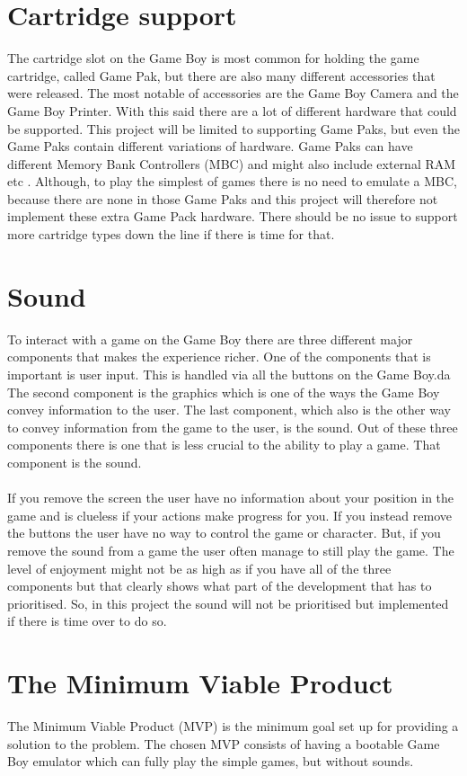\section{Cartridge support}
The cartridge slot on the Game Boy is most common for holding the game cartridge, called Game Pak, but there are also many different accessories that were released.
The most notable of accessories are the Game Boy Camera and the Game Boy Printer.
With this said there are a lot of different hardware that could be supported.
This project will be limited to supporting Game Paks, but even the Game Paks contain different variations of hardware.
Game Paks can have different Memory Bank Controllers (MBC) and might also include external RAM etc \cite{cartridgeType}.
Although, to play the simplest of games there is no need to emulate a MBC, because there are none in those Game Paks and this project will therefore not implement these extra Game Pack hardware.
There should be no issue to support more cartridge types down the line if there is time for that.

\section{Sound}
To interact with a game on the Game Boy there are three different major components that makes the experience richer. 
One of the components that is important is user input.
This is handled via all the buttons on the Game Boy.da
The second component is the graphics which is one of the ways the Game Boy convey information to the user.
The last component, which also is the other way to convey information from the game to the user, is the sound.
Out of these three components there is one that is less crucial to the ability to play a game. 
That component is the sound.
\\\\
If you remove the screen the user have no information about your position in the game and is clueless if your actions make progress for you.
If you instead remove the buttons the user have no way to control the game or character.
But, if you remove the sound from a game the user often manage to still play the game.
The level of enjoyment might not be as high as if you have all of the three components but that clearly shows what part of the development that has to prioritised.
So, in this project the sound will not be prioritised but implemented if there is time over to do so.

\section{The Minimum Viable Product}
The Minimum Viable Product (MVP) is the minimum goal set up for providing a solution to the problem. 
The chosen MVP consists of having a bootable Game Boy emulator which can fully play the simple games, but without sounds.
